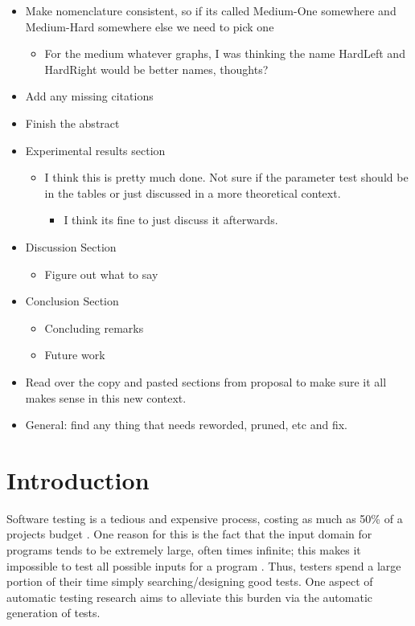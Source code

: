 \documentclass[runningheads]{llncs}
\begin{document}
\begin{itemize}
\item Make nomenclature consistent, so if its called Medium-One somewhere and Medium-Hard somewhere else we need to pick one
     \begin{itemize}
     \item For the medium whatever graphs, I was thinking the name HardLeft and HardRight would be better names, thoughts?
     \end{itemize}
\item Add any missing citations
\item Finish the abstract
\item Experimental results section
     \begin{itemize}
     \item I think this is pretty much done. Not sure if the parameter test should be in the tables
	     or just discussed in a more theoretical context.
	     \begin{itemize}
          \item I think its fine to just discuss it afterwards.
         \end{itemize}
     \end{itemize}
\item Discussion Section
     \begin{itemize}
     \item Figure out what to say
     \end{itemize}
\item Conclusion Section
     \begin{itemize}
     \item Concluding remarks
     \item Future work
     \end{itemize}
\item Read over the copy and pasted sections from proposal to make sure it all makes sense in this new context.
\item General: find any thing that needs reworded, pruned, etc and fix.
\end{itemize}

\section{Introduction}
Software testing is a tedious and expensive process, costing as much as 50\% of a projects budget \cite{meyers1}. One reason for this is the fact that the input domain for programs tends to be extremely large, often times infinite; this makes it impossible to test all possible inputs for a program \cite{meyers1}. Thus, testers spend a large portion of their time simply searching/designing good tests. One aspect of automatic testing research aims to alleviate this burden via the automatic generation of tests.
\end{document}
